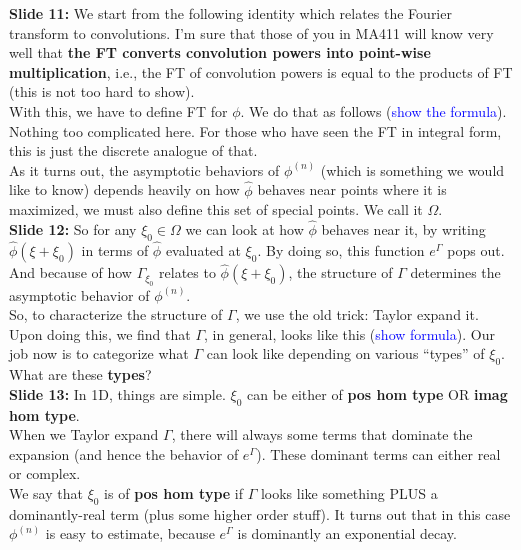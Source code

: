 \documentclass[11pt]{article}
\begin{document}
\noindent \textbf{Slide 11: } We start from the following identity which relates the Fourier transform to convolutions. I'm sure that those of you in MA411 will know very well that \textbf{the FT converts convolution powers into point-wise multiplication}, i.e., the FT of convolution powers is equal to the products of FT (this is not too hard to show). \\


With this, we have to define FT for $\phi$. We do that as follows (\textcolor{blue}{show the formula}). Nothing too complicated here. For those who have seen the FT in integral form, this is just the discrete analogue of that.\\


As it turns out, the asymptotic behaviors of $\phi^{(n)}$ (which is something we would like to know) depends heavily on how $\widehat{\phi}$ behaves near points where it is maximized, we must also define this set of special points. We call it $\Omega$.\\





\noindent \textbf{Slide 12: } So for any $\xi_0 \in \Omega$ we can look at how $\widehat{\phi}$ behaves near it, by writing $\widehat{\phi}(\xi + \xi_0)$ in terms of $\widehat{\phi}$ evaluated at $\xi_0$. By doing so, this function $e^{\Gamma}$ pops out. And because of how $\Gamma_{\xi_0}$ relates to $\widehat{\phi}(\xi + \xi_0)$, the structure of $\Gamma$ determines the asymptotic behavior of $\phi^{(n)}$. \\


So, to characterize the structure of $\Gamma$, we use the old trick: Taylor expand it. Upon doing this, we find that $\Gamma$, in general, looks like this (\textcolor{blue}{show formula}). Our job now is to categorize what $\Gamma$ can look like depending on various ``types'' of $\xi_0$. What are these \textbf{types}? \\




\noindent \textbf{Slide 13:} In 1D, things are simple. $\xi_0$ can be either of \textbf{pos hom type} OR \textbf{imag hom type}.\\


When we Taylor expand $\Gamma$, there will always some terms that dominate the expansion (and hence the behavior of $e^\Gamma$). These dominant terms can either real or complex. \\


We say that $\xi_0$ is of \textbf{pos hom type} if $\Gamma$ looks like something PLUS a dominantly-real term (plus some higher order stuff). It turns out that in this case $\phi^{(n)}$ is easy to estimate, because $e^\Gamma$ is dominantly an exponential decay. \\
\end{document}
